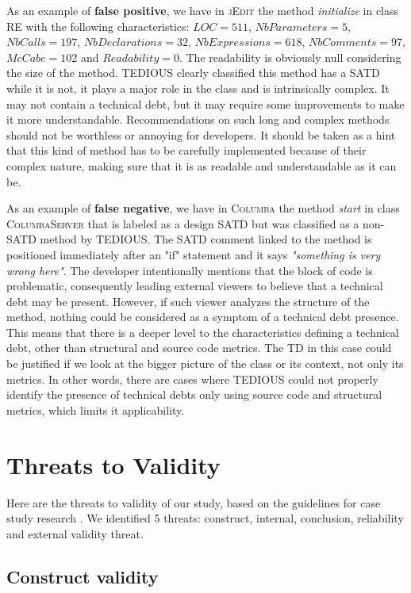 As an example of \textbf{false positive}, we have in \textsc{jEdit} the method \textit{initialize} in class \textsc{RE} with the following characteristics: $LOC=511$, $NbParameters=5$, $NbCalls=197$, $NbDeclarations=32$, $NbExpressions=618$, $NbComments=97$, $McCabe=102$ and $Readability=0$. The readability is obviously null considering the size of the method. TEDIOUS clearly classified this method has a SATD while it is not, it plays a major role in the class and is intrinsically complex. It may not contain a technical debt, but it may require some improvements to make it more understandable. Recommendations on such long and complex methods should not be worthless or annoying for developers. It should be taken as a hint that this kind of method has to be carefully implemented because of their complex nature, making sure that it is as readable and understandable as it can be. 

As an example of \textbf{false negative}, we have in \textsc{Columba} the method \textit{start} in class \textsc{ColumbaServer} that is labeled as a design SATD but was classified as a non-SATD method by TEDIOUS. The SATD comment linked to the method is positioned immediately after an "if" statement and it says \textit{"something is very wrong here"}. The developer intentionally mentions that the block of code is problematic, consequently leading external viewers to believe that a technical debt may be present. However, if such viewer analyzes the structure of the method, nothing could be considered as a symptom of a technical debt presence. This means that there is a deeper level to the characteristics defining a technical debt, other than structural and source code metrics. The TD in this case could be justified if we look at the bigger picture of the class or its context, not only its metrics. In other words, there are cases where TEDIOUS could not properly identify the presence of technical debts only using source code and structural metrics, which limits it applicability.

\section{Threats to Validity}

Here are the threats to validity of our study, based on the guidelines for case study research \citep{yin2013case}. We identified 5 threats: construct, internal, conclusion, reliability and external validity threat.

\subsection{Construct validity}

